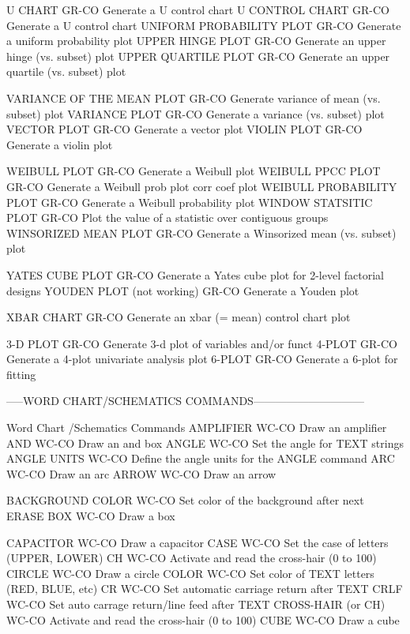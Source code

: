 U CHART                     GR-CO Generate a U control chart
U CONTROL CHART             GR-CO Generate a U control chart
UNIFORM PROBABILITY PLOT    GR-CO Generate a uniform probability plot
UPPER HINGE PLOT            GR-CO Generate an upper hinge (vs. subset) plot
UPPER QUARTILE PLOT         GR-CO Generate an upper quartile (vs. subset) plot

VARIANCE OF THE MEAN PLOT   GR-CO Generate variance of mean (vs. subset) plot
VARIANCE PLOT               GR-CO Generate a variance (vs. subset) plot
VECTOR PLOT                 GR-CO Generate a vector plot
VIOLIN PLOT                 GR-CO Generate a violin plot

WEIBULL PLOT                GR-CO Generate a Weibull plot
WEIBULL PPCC PLOT           GR-CO Generate a Weibull prob plot corr coef plot
WEIBULL PROBABILITY PLOT    GR-CO Generate a Weibull probability plot
WINDOW STATSITIC PLOT       GR-CO Plot the value of a statistic over contiguous groups
WINSORIZED MEAN PLOT        GR-CO Generate a Winsorized mean (vs. subset) plot

YATES CUBE PLOT             GR-CO Generate a Yates cube plot for 2-level factorial designs
YOUDEN PLOT (not working)   GR-CO Generate a Youden plot

XBAR CHART                  GR-CO Generate an xbar (= mean) control chart plot

3-D PLOT                    GR-CO Generate 3-d plot of variables and/or funct
4-PLOT                      GR-CO Generate a 4-plot univariate analysis plot
6-PLOT                      GR-CO Generate a 6-plot for fitting

-----WORD CHART/SCHEMATICS COMMANDS------------------------------

Word Chart /Schematics Commands
AMPLIFIER                   WC-CO Draw an amplifier
AND                         WC-CO Draw an and box
ANGLE                       WC-CO Set the angle for TEXT strings
ANGLE UNITS                 WC-CO Define the angle units for the ANGLE command
ARC                         WC-CO Draw an arc
ARROW                       WC-CO Draw an arrow

BACKGROUND COLOR            WC-CO Set color of the background after next ERASE
BOX                         WC-CO Draw a box

CAPACITOR                   WC-CO Draw a capacitor
CASE                        WC-CO Set the case of letters (UPPER, LOWER)
CH                          WC-CO Activate and read the cross-hair (0 to 100)
CIRCLE                      WC-CO Draw a circle
COLOR                       WC-CO Set color of TEXT letters (RED, BLUE, etc)
CR                          WC-CO Set automatic carriage return after TEXT
CRLF                        WC-CO Set auto carrage return/line feed after TEXT
CROSS-HAIR (or CH)          WC-CO Activate and read the cross-hair (0 to 100)
CUBE                        WC-CO Draw a cube


